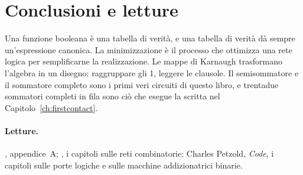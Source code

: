 \section{Conclusioni e letture}

Una funzione booleana è una tabella di verità, e una tabella di verità dà
sempre un'espressione canonica. La minimizzazione è il processo che ottimizza
una rete logica per semplificarne la realizzazione. Le mappe di Karnaugh
trasformano l'algebra in un disegno: raggruppare gli 1, leggere le clausole. Il
semisommatore e il sommatore completo sono i primi veri circuiti di questo
libro, e trentadue sommatori completi in fila sono ciò che esegue la 
scritta nel Capitolo~\ref{ch:firstcontact}.

\paragraph{Letture.} \citet{patterson2020}, appendice~A; \citet{bucci2017}, i
capitoli sulle reti combinatorie; Charles Petzold, \emph{Code}, i capitoli
sulle porte logiche e sulle macchine addizionatrici binarie.
